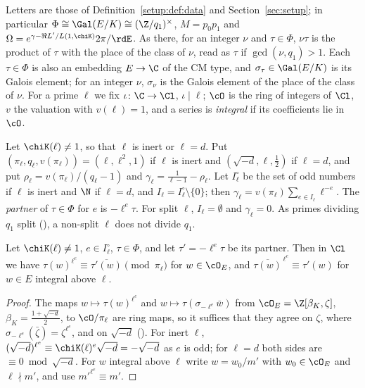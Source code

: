 \begin{notation}
Letters are those of Definition~\ref{setup:def:data} and Section~\ref{sec:setup}; in particular
$\Phi\cong\Gal(E/K)\cong(\Z/q_1)^\times$, $M=p_0p_1$ and
$\Omega=e^{\gamma-\Re L'/L(1,\chiK)}2\pi/\rdE$. As there, for an integer $\nu$ and $\tau\in\Phi$,
$\nu\tau$ is the product of $\tau$ with the place of the class of $\nu$, read as $\tau$ if
$\gcd(\nu,q_1)>1$. Each $\tau\in\Phi$ is also an embedding $E\to\C$ of the CM type, and
$\sigma_\tau\in\Gal(E/K)$ is its Galois element; for an integer $\nu$, $\sigma_\nu$ is the Galois
element of the place of the class of $\nu$. For a prime $\ell$ we fix $\iota\colon\C\to\Cl$,
$\iota\mid\ell$; $\cO$ is the ring of integers of $\Cl$, $v$ the valuation with $v(\ell)=1$, and a
series is \emph{integral} if its coefficients lie in $\cO$.
\end{notation}

\begin{definition}\label{der:def:nonsplit}
Let $\chiK(\ell)\ne1$, so that $\ell$ is inert or $\ell=d$. Put
$(\pi_\ell,q_\ell,v(\pi_\ell))=(\ell,\ell^2,1)$ if $\ell$ is inert and $(\sqrt{-d},\ell,\frac12)$ if
$\ell=d$, and put $\rho_\ell=v(\pi_\ell)/(q_\ell-1)$ and $\gamma_\ell=\frac1{\ell-1}-\rho_\ell$. Let
$I_\ell^\circ$ be the set of odd numbers if $\ell$ is inert and $\N$ if $\ell=d$, and
$I_\ell=I_\ell^\circ\setminus\{0\}$; then $\gamma_\ell=v(\pi_\ell)\sum_{e\in I_\ell}\ell^{-e}$. The
\emph{partner} of $\tau\in\Phi$ for $e$ is $-\ell^e\tau$. For split $\ell$, $I_\ell=\emptyset$ and
$\gamma_\ell=0$. As primes dividing $q_1$ split (), a
non-split $\ell$ does not divide $q_1$.
\end{definition}

\begin{lemma}
\label{der:lem:frob}
Let $\chiK(\ell)\ne1$, $e\in I_\ell^\circ$, $\tau\in\Phi$, and let $\tau'=-\ell^e\tau$ be its partner.
Then in $\Cl$ we have $\tau(w)^{\ell^e}\equiv\overline{\tau'(w)}\pmod{\pi_\ell}$ for $w\in\cO_E$, and
$\overline{\tau(w)}^{\,\ell^e}\equiv\tau'(w)$ for $w\in E$ integral above $\ell$.
\end{lemma}

\begin{proof}
The maps $w\mapsto\tau(w)^{\ell^e}$ and $w\mapsto\tau(\sigma_{-\ell^e}\bar w)$ from
$\cO_E=\Z[\beta_K,\zeta]$, $\beta_K=\frac{1+\sqrt{-d}}2$, to $\cO/\pi_\ell$ are ring maps, so it
suffices that they agree on $\zeta$, where $\sigma_{-\ell^e}(\bar\zeta)=\zeta^{\ell^e}$, and on
$\sqrt{-d}$ (). For inert $\ell$,
$(\sqrt{-d})^{\ell^e}\equiv\chiK(\ell)^e\sqrt{-d}=-\sqrt{-d}$ as $e$ is odd; for $\ell=d$ both sides
are $\equiv0\bmod\sqrt{-d}$. For $w$ integral above $\ell$ write $w=w_0/m'$ with $w_0\in\cO_E$ and
$\ell\nmid m'$, and use ${m'}^{\ell^e}\equiv m'$.
\end{proof}

